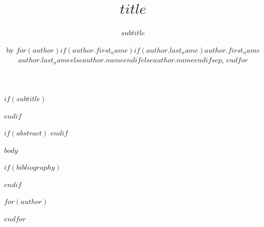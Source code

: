 \title{$title$}

$if(subtitle)$
\subtitle{%
$subtitle$
}
$endif$

\author{by $for(author)$$if(author.first_name)$$if(author.last_name)$$author.first_name$ $author.last_name$$else$$author.name$$endif$$else$$author.name$$endif$$sep$, $endfor$}

\maketitle

$if(abstract)$
$endif$

$body$

$if(bibliography)$

$endif$

$for(author)$
\address{%
$if(author.first_name)$$if(author.last_name)$$author.first_name$ $author.last_name$$else$$author.name$$endif$$else$$author.name$$endif$\\
$author.affiliation$\\%
$for(author.address)$$author.address$$sep$\\ $endfor$\\
$if(author.affiliation2)$
$author.affiliation2$\\%
$for(author.address2)$$author.address2$$sep$\\ $endfor$\\
$endif$%
$if(author.url)$$author.url$\\$endif$%
$if(author.orcid)$\textit{ORCID: \href{https://orcid.org/$author.orcid$}{$author.orcid$}}\\$endif$%
$if(author.email)$$author.email$$endif$%
}

$endfor$
